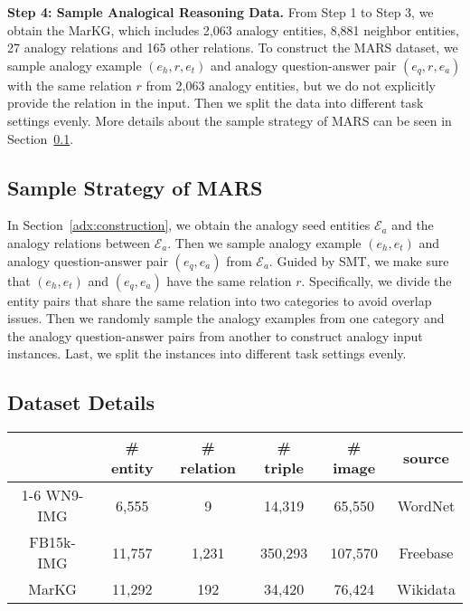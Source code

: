 \documentclass{article} \usepackage{iclr2023_conference,times}
\newcommand{\data}{MARS}
\newcommand{\kg}{MarKG}
\begin{document}
\textbf{Step 4: Sample Analogical Reasoning Data.}
From Step 1 to Step 3, we obtain the {\kg},
which includes 2,063 analogy entities, 8,881 neighbor entities, 27 analogy relations and 165 other relations. 
To construct the {\data} dataset, we sample analogy example $(e_h, r, e_t)$ and analogy question-answer pair $(e_q, r, e_a)$ with the same relation $r$ from 2,063 analogy entities, but we do not explicitly provide the relation in the input.
Then we split the data into different task settings evenly.
More details about the sample strategy of {\data} can be seen in Section~\ref{adx:sample}.

\subsection{Sample Strategy of {\data}}
\label{adx:sample}

In Section~\ref{adx:construction}, we obtain the analogy seed entities $\mathcal{E}_a$ and the analogy relations between $\mathcal{E}_a$. Then we sample analogy example $(e_h, e_t)$ and analogy question-answer pair $(e_q, e_a)$ from $\mathcal{E}_a$. Guided by SMT, we make sure that $(e_h, e_t)$ and $(e_q, e_a)$ have the same relation $r$. Specifically, we divide the entity pairs that share the same relation into two categories to avoid overlap issues. Then we randomly sample the analogy examples from one category and the analogy question-answer pairs from another to construct analogy input instances. 
Last, we split the instances into different task settings evenly.



\subsection{Dataset Details}
\label{sec:adx_dataset_static}

\begin{table*}[!htp]
\small
\centering
\begin{tabular}{cccccc}
\toprule
  & \# entity & \# relation & \# triple & \# image & source \\
\cmidrule{1-6}
WN9-IMG & 6,555 & 9 & 14,319 & 65,550 & WordNet \\
FB15k-IMG & 11,757 & 1,231 & 350,293 & 107,570 & Freebase \\
{\kg} & 11,292 & 192 & 34,420 & 76,424 & Wikidata \\
\bottomrule
\end{tabular}
\caption{Data statistics of {\kg}. \# refers to the number of.}
\label{tab:adx_static_markg}
\end{table*}
\end{document}
